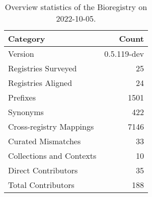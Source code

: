 \begin{table}
\centering
\caption{Overview statistics of the Bioregistry on 2022-10-05.}
\label{tab:bioregistry-summary}
\begin{tabular}{lr}
\toprule
                Category &       Count \\
\midrule
                 Version & 0.5.119-dev \\
     Registries Surveyed &          25 \\
      Registries Aligned &          24 \\
                Prefixes &        1501 \\
                Synonyms &         422 \\
 Cross-registry Mappings &        7146 \\
      Curated Mismatches &          33 \\
Collections and Contexts &          10 \\
     Direct Contributors &          35 \\
      Total Contributors &         188 \\
\bottomrule
\end{tabular}
\end{table}
